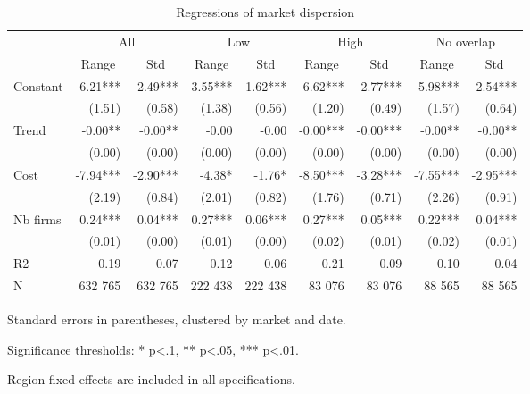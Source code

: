 \documentclass[english]{article}
\begin{document}
\begin{table}%
\caption{Regressions of market dispersion}
\label{tab:regs_market_dispersion_after}
\begin{threeparttable}
    \begin{tabular}{lrrrrrrrr}
    \toprule
    \toprule
          & \multicolumn{2}{c}{All} & \multicolumn{2}{c}{Low} & \multicolumn{2}{c}{High} & \multicolumn{2}{c}{No overlap} \\
          & \multicolumn{1}{c}{Range} & \multicolumn{1}{c}{Std} & \multicolumn{1}{c}{Range} & \multicolumn{1}{c}{Std} & \multicolumn{1}{c}{Range} & \multicolumn{1}{c}{Std} & \multicolumn{1}{c}{Range} & \multicolumn{1}{c}{Std} \\
    \midrule
    Constant & 6.21*** & 2.49*** & 3.55*** & 1.62*** & 6.62*** & 2.77*** & 5.98*** & 2.54*** \\
          & (1.51) & (0.58) & (1.38) & (0.56) & (1.20) & (0.49) & (1.57) & (0.64) \\
    Trend & -0.00** & -0.00** & -0.00 & -0.00 & -0.00*** & -0.00*** & -0.00** & -0.00** \\
          & (0.00) & (0.00) & (0.00) & (0.00) & (0.00) & (0.00) & (0.00) & (0.00) \\
    Cost  & -7.94*** & -2.90*** & -4.38* & -1.76* & -8.50*** & -3.28*** & -7.55*** & -2.95*** \\
          & (2.19) & (0.84) & (2.01) & (0.82) & (1.76) & (0.71) & (2.26) & (0.91) \\
    Nb firms & 0.24*** & 0.04*** & 0.27*** & 0.06*** & 0.27*** & 0.05*** & 0.22*** & 0.04*** \\
          & (0.01) & (0.00) & (0.01) & (0.00) & (0.02) & (0.01) & (0.02) & (0.01) \\
    \midrule
    R2    & 0.19  & 0.07  & 0.12  & 0.06  & 0.21  & 0.09  & 0.10  & 0.04 \\
    N     & 632 765 & 632 765 & 222 438 & 222 438 & 83 076 & 83 076 & 88 565 & 88 565 \\
\bottomrule
\bottomrule
\end{tabular}
\begin{tablenotes}
      \small
      \item Standard errors in parentheses, clustered by market and date.
      \item Significance thresholds: * p<.1, ** p<.05, *** p<.01.
      \item Region fixed effects are included in all specifications.
\end{tablenotes}
\end{threeparttable}
\end{table}
\end{document}

